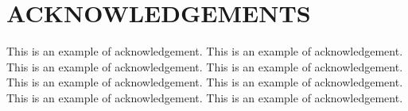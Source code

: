 \section*{ACKNOWLEDGEMENTS}
This is an example of acknowledgement\cite{Example}. This is an example of acknowledgement. This is an example of acknowledgement. This is an example of acknowledgement\cite{Example}. This is an example of acknowledgement. This is an example of acknowledgement. This is an example of acknowledgement. This is an example of acknowledgement\cite{Example}.
